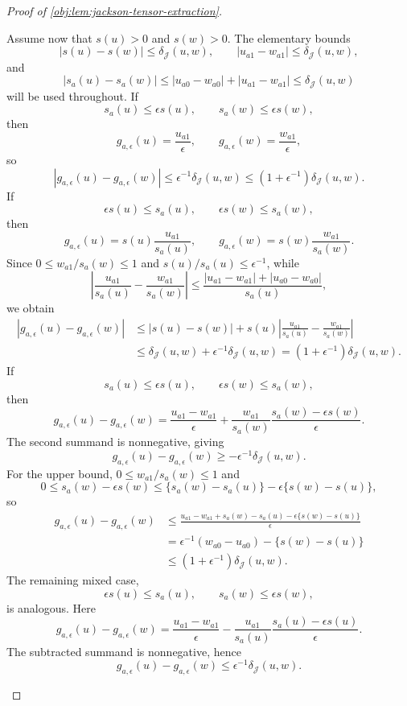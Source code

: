 \begin{proof}[Proof of \cref{obj:lem:jackson-tensor-extraction}]
\begin{enumerate}
Assume now that \(s(u)>0\) and \(s(w)>0\). The elementary bounds
\[
|s(u)-s(w)|\le\delta_{\mathcal J}(u,w),
\qquad
|u_{a1}-w_{a1}|\le\delta_{\mathcal J}(u,w),
\]
and
\[
|s_a(u)-s_a(w)|
\le
|u_{a0}-w_{a0}|+|u_{a1}-w_{a1}|
\le
\delta_{\mathcal J}(u,w)
\]
will be used throughout. If
\[
s_a(u)\le\epsilon s(u),
\qquad
s_a(w)\le\epsilon s(w),
\]
then
\[
g_{a,\epsilon}(u)=\frac{u_{a1}}{\epsilon},
\qquad
g_{a,\epsilon}(w)=\frac{w_{a1}}{\epsilon},
\]
so
\[
|g_{a,\epsilon}(u)-g_{a,\epsilon}(w)|
\le
\epsilon^{-1}\delta_{\mathcal J}(u,w)
\le
(1+\epsilon^{-1})\delta_{\mathcal J}(u,w).
\]
If
\[
\epsilon s(u)\le s_a(u),
\qquad
\epsilon s(w)\le s_a(w),
\]
then
\[
g_{a,\epsilon}(u)=s(u)\frac{u_{a1}}{s_a(u)},
\qquad
g_{a,\epsilon}(w)=s(w)\frac{w_{a1}}{s_a(w)}.
\]
Since \(0\le w_{a1}/s_a(w)\le1\) and \(s(u)/s_a(u)\le\epsilon^{-1}\), while
\[
\left|
\frac{u_{a1}}{s_a(u)}
-
\frac{w_{a1}}{s_a(w)}
\right|
\le
\frac{|u_{a1}-w_{a1}|+|u_{a0}-w_{a0}|}{s_a(u)},
\]
we obtain
\[
\begin{aligned}
|g_{a,\epsilon}(u)-g_{a,\epsilon}(w)|
&\le
|s(u)-s(w)|
+
s(u)
\left|
\frac{u_{a1}}{s_a(u)}
-
\frac{w_{a1}}{s_a(w)}
\right|\\
&\le
\delta_{\mathcal J}(u,w)
+
\epsilon^{-1}\delta_{\mathcal J}(u,w)
=
(1+\epsilon^{-1})\delta_{\mathcal J}(u,w).
\end{aligned}
\]
If
\[
s_a(u)\le\epsilon s(u),
\qquad
\epsilon s(w)\le s_a(w),
\]
then
\[
g_{a,\epsilon}(u)-g_{a,\epsilon}(w)
=
\frac{u_{a1}-w_{a1}}{\epsilon}
+
\frac{w_{a1}}{s_a(w)}
\frac{s_a(w)-\epsilon s(w)}{\epsilon}.
\]
The second summand is nonnegative, giving
\[
g_{a,\epsilon}(u)-g_{a,\epsilon}(w)
\ge
-\epsilon^{-1}\delta_{\mathcal J}(u,w).
\]
For the upper bound, \(0\le w_{a1}/s_a(w)\le1\) and
\[
0\le s_a(w)-\epsilon s(w)
\le
\{s_a(w)-s_a(u)\}-\epsilon\{s(w)-s(u)\},
\]
so
\[
\begin{aligned}
g_{a,\epsilon}(u)-g_{a,\epsilon}(w)
&\le
\frac{u_{a1}-w_{a1}+s_a(w)-s_a(u)-\epsilon\{s(w)-s(u)\}}{\epsilon}\\
&=
\epsilon^{-1}(w_{a0}-u_{a0})-\{s(w)-s(u)\}\\
&\le
(1+\epsilon^{-1})\delta_{\mathcal J}(u,w).
\end{aligned}
\]
The remaining mixed case,
\[
\epsilon s(u)\le s_a(u),
\qquad
s_a(w)\le\epsilon s(w),
\]
is analogous. Here
\[
g_{a,\epsilon}(u)-g_{a,\epsilon}(w)
=
\frac{u_{a1}-w_{a1}}{\epsilon}
-
\frac{u_{a1}}{s_a(u)}
\frac{s_a(u)-\epsilon s(u)}{\epsilon}.
\]
The subtracted summand is nonnegative, hence
\[
g_{a,\epsilon}(u)-g_{a,\epsilon}(w)
\le
\epsilon^{-1}\delta_{\mathcal J}(u,w).
\]

\end{enumerate}
\end{proof}
